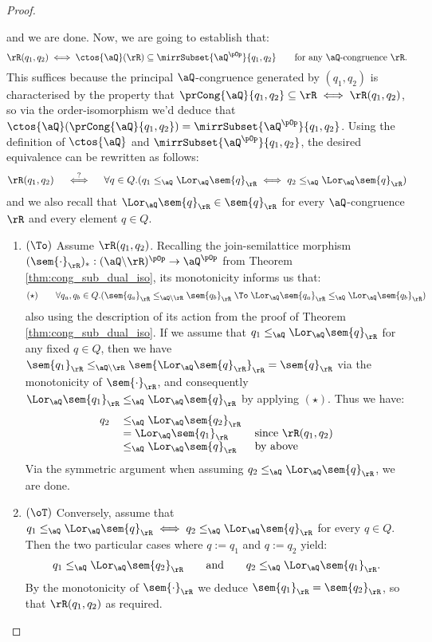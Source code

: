 \documentclass{article}
\begin{document}
\begin{proof}
\begin{enumerate}
and we are done. Now, we are going to establish that:
\[
\rR(q_1,q_2) \iff \ctos{\aQ}(\rR) \subseteq \mirrSubset{\aQ^{\pOp}}{q_1,q_2}
\qquad
\text{for any $\aQ$-congruence $\rR$}.
\]
This suffices because the principal $\aQ$-congruence generated by $(q_1,q_2)$ is characterised by the property that $\prCong{\aQ}{q_1,q_2} \subseteq \rR \iff \rR(q_1,q_2)$, so via the order-isomorphism we'd deduce that $\ctos{\aQ}(\prCong{\aQ}{q_1,q_2}) = \mirrSubset{\aQ^{\pOp}}{q_1,q_2}$. Using the definition of $\ctos{\aQ}$ and $\mirrSubset{\aQ^{\pOp}}{q_1,q_2}$, the desired equivalence can be rewritten as follows:
\[
\rR(q_1,q_2) 
\quad\stackrel{?}{\iff}\quad
\forall q \in Q.( q_1 \leq_\aQ \Lor_\aQ \sem{q}_\rR \iff q_2 \leq_\aQ \Lor_\aQ \sem{q}_\rR  )
\]
and we also recall that $\Lor_\aQ \sem{q}_\rR \in \sem{q}_\rR$ for every $\aQ$-congruence $\rR$ and every element $q \in Q$.
\begin{enumerate}
\item
$(\To)$ Assume $\rR(q_1,q_2)$. Recalling the join-semilattice morphism $(\sem{\cdot}_\rR)_* : (\aQ \backslash \rR)^{\pOp} \to \aQ^{\pOp}$ from Theorem \ref{thm:cong_sub_dual_iso}, its monotonicity informs us that:
\[
\mathrm{(\star)}
\qquad
\forall q_a, q_b \in Q.( \sem{q_a}_\rR \leq_{\aQ\backslash\rR} \sem{q_b}_\rR \;\To\; \Lor_\aQ \sem{q_a}_\rR \leq_\aQ \Lor_\aQ \sem{q_b}_\rR  )
\]
also using the description of its action from the proof of Theorem \ref{thm:cong_sub_dual_iso}. If we assume that $q_1 \leq_\aQ \Lor_\aQ \sem{q}_\rR$ for any fixed $q \in Q$, then we have $\sem{q_1}_\rR \leq_{\aQ\backslash\rR} \sem{\Lor_\aQ \sem{q}_\rR}_\rR = \sem{q}_\rR$ via the monotonicity of $\sem{\cdot}_\rR$, and consequently  $\Lor_\aQ \sem{q_1}_\rR \leq_\aQ \Lor_\aQ \sem{q}_\rR$ by applying $\mathrm{(\star)}$. Thus we have:
\[
\begin{tabular}{lll}
$q_2$
&
$\leq_\aQ \Lor_\aQ \sem{q_2}_\rR$
\\&
$= \Lor_\aQ \sem{q_1}_\rR $
& since $\rR(q_1,q_2)$
\\& 
$\leq_\aQ \Lor_\aQ \sem{q}_\rR$
& by above
\end{tabular}
\]
Via the symmetric argument when assuming $q_2 \leq_\aQ \Lor_\aQ \sem{q}_\rR$, we are done.

\item
$(\oT)$ Conversely, assume that $q_1 \leq_\aQ \Lor_\aQ \sem{q}_\rR \iff q_2 \leq_\aQ \Lor_\aQ \sem{q}_\rR$ for every $q \in Q$. Then the two particular cases where $q := q_1$ and $q := q_2$ yield:
\[
q_1 \leq_\aQ \Lor_\aQ \sem{q_2}_\rR
\qquad\text{and}\qquad
q_2 \leq_\aQ \Lor_\aQ \sem{q_1}_\rR.
\]
By the monotonicity of $\sem{\cdot}_\rR$ we deduce $\sem{q_1}_\rR = \sem{q_2}_\rR$, so that $\rR(q_1,q_2)$ as required.


\end{enumerate}
\end{enumerate}
\end{proof}
\end{document}
